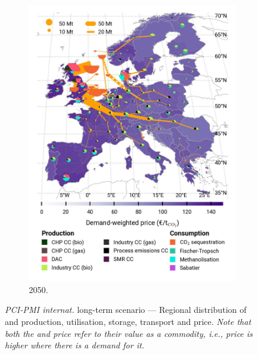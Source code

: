 \documentclass[preprint,12pt,sort&compress]{elsarticle}
\begin{document}
\begin{figure}[htbp]
\begin{subfigure}[t]{0.33\textwidth}
      \includegraphics[width=1\textwidth]{maps/pcipmi-national-international-expansion/base_s_adm___2050-balance_map_co2_stored} 
      \caption{ 2050.}
      \label{fig:PCI-in_lt_2050_co2}
  \end{subfigure}
  \vspace{0.3cm}
  \caption{\textit{PCI-PMI internat.} long-term scenario --- Regional distribution of  and  production, utilisation, storage, transport and price. \textit{Note that both the  and  price refer to their value as a commodity, i.e., price is higher where there is a demand for it.}}
  \label{fig:PCI-in_lt}
\end{figure}
\end{document}
